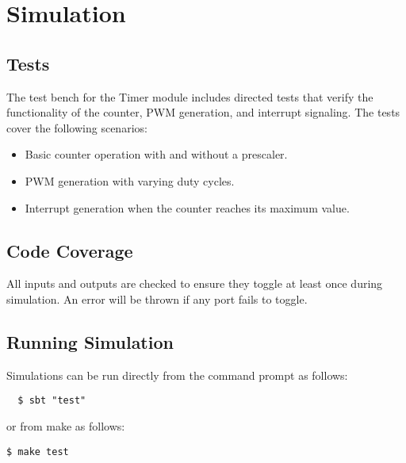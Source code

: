 \section{Simulation}

\subsection{Tests}
The test bench for the Timer module includes directed tests that verify the functionality of the counter, PWM generation, and interrupt signaling. The tests cover the following scenarios:

\begin{itemize}
  \item{Basic counter operation with and without a prescaler.}
  \item{PWM generation with varying duty cycles.}
  \item{Interrupt generation when the counter reaches its maximum value.}
\end{itemize}

\subsection{Code Coverage}
All inputs and outputs are checked to ensure they toggle at least once during simulation. An error will be thrown if any port fails to toggle.

\subsection{Running Simulation}
Simulations can be run directly from the command prompt as follows:

\begin{verbatim}
  $ sbt "test"
\end{verbatim}

or from make as follows:

\texttt{\$ make test}